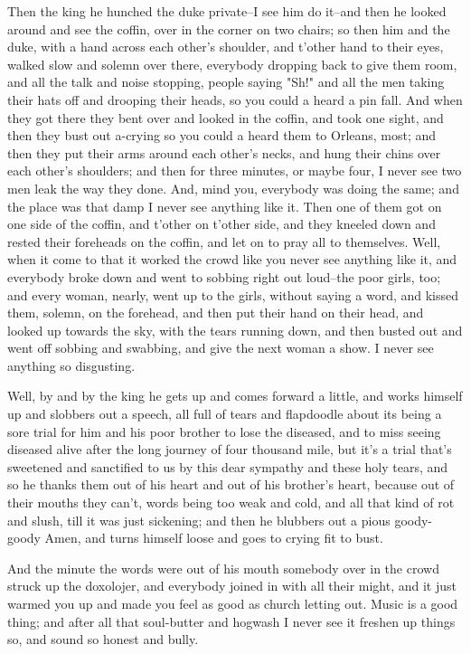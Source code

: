 Then the king he hunched the duke private--I see him do it--and then he
looked around and see the coffin, over in the corner on two chairs; so
then him and the duke, with a hand across each other's shoulder, and
t'other hand to their eyes, walked slow and solemn over there, everybody
dropping back to give them room, and all the talk and noise stopping,
people saying "Sh!" and all the men taking their hats off and drooping
their heads, so you could a heard a pin fall.  And when they got there
they bent over and looked in the coffin, and took one sight, and then
they bust out a-crying so you could a heard them to Orleans, most; and
then they put their arms around each other's necks, and hung their chins
over each other's shoulders; and then for three minutes, or maybe four, I
never see two men leak the way they done.  And, mind you, everybody was
doing the same; and the place was that damp I never see anything like it.
Then one of them got on one side of the coffin, and t'other on t'other
side, and they kneeled down and rested their foreheads on the coffin, and
let on to pray all to themselves.  Well, when it come to that it worked
the crowd like you never see anything like it, and everybody broke down
and went to sobbing right out loud--the poor girls, too; and every woman,
nearly, went up to the girls, without saying a word, and kissed them,
solemn, on the forehead, and then put their hand on their head, and
looked up towards the sky, with the tears running down, and then busted
out and went off sobbing and swabbing, and give the next woman a show.  I
never see anything so disgusting.

Well, by and by the king he gets up and comes forward a little, and works
himself up and slobbers out a speech, all full of tears and flapdoodle
about its being a sore trial for him and his poor brother to lose the
diseased, and to miss seeing diseased alive after the long journey of
four thousand mile, but it's a trial that's sweetened and sanctified to
us by this dear sympathy and these holy tears, and so he thanks them out
of his heart and out of his brother's heart, because out of their mouths
they can't, words being too weak and cold, and all that kind of rot and
slush, till it was just sickening; and then he blubbers out a pious
goody-goody Amen, and turns himself loose and goes to crying fit to bust.

And the minute the words were out of his mouth somebody over in the crowd
struck up the doxolojer, and everybody joined in with all their might,
and it just warmed you up and made you feel as good as church letting
out. Music is a good thing; and after all that soul-butter and hogwash I
never see it freshen up things so, and sound so honest and bully.

